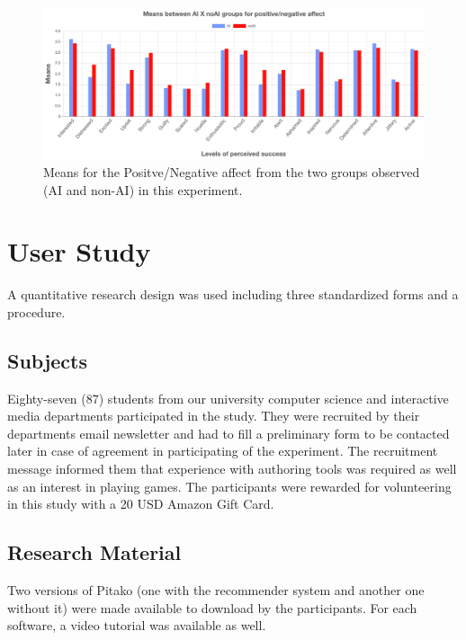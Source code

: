 \documentclass[letterpaper]{article} %
\begin{document}
\begin{figure}[ht]
\includegraphics[width=\linewidth]{panas.png}
\caption{Means for the Positve/Negative affect from the two groups observed (AI and non-AI) in this experiment.}
\label{panas}
\end{figure}

\section{User Study}
A quantitative research design was used including three standardized forms and a procedure.

\subsection{Subjects}
Eighty-seven (87) students from our university computer science and interactive media departments participated in the study. They were recruited by their departments email newsletter and had to fill a preliminary form to be contacted later in case of agreement in participating of the experiment. The recruitment message informed them that experience with authoring tools was required as well as an interest in playing games. The participants were rewarded for volunteering in this study with a 20 USD Amazon Gift Card.

\subsection{Research Material}
Two versions of Pitako (one with the recommender system and another one without it) were made available to download by the participants. For each software, a video tutorial was available as well.
\end{document}

